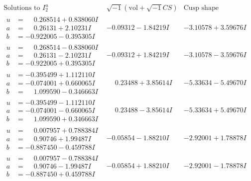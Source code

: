 \documentclass[1p]{elsarticle_modified}
\theoremstyle{definition}
\newcommand{\I}{\sqrt{-1}}
\begin{document}
$$\begin{array}{c|c|c}  
\text{Solutions to }I^u_{2}& \I (\text{vol} + \sqrt{-1}CS) & \text{Cusp shape}\\
 \hline 
\begin{aligned}
u &= \phantom{-}0.268514 + 0.838060 I \\
a &= \phantom{-}0.26131 + 2.10231 I \\
b &= -0.922005 - 0.395305 I\end{aligned}
 & -0.09312 - 1.84219 I & -3.10578 + 3.59676 I \\ \hline\begin{aligned}
u &= \phantom{-}0.268514 - 0.838060 I \\
a &= \phantom{-}0.26131 - 2.10231 I \\
b &= -0.922005 + 0.395305 I\end{aligned}
 & -0.09312 + 1.84219 I & -3.10578 - 3.59676 I \\ \hline\begin{aligned}
u &= -0.395499 + 1.112110 I \\
a &= -0.074001 + 0.660065 I \\
b &= \phantom{-}1.099590 - 0.346663 I\end{aligned}
 & \phantom{-}0.23488 + 3.85614 I & -5.33634 - 5.49670 I \\ \hline\begin{aligned}
u &= -0.395499 - 1.112110 I \\
a &= -0.074001 - 0.660065 I \\
b &= \phantom{-}1.099590 + 0.346663 I\end{aligned}
 & \phantom{-}0.23488 - 3.85614 I & -5.33634 + 5.49670 I \\ \hline\begin{aligned}
u &= \phantom{-}0.007957 + 0.788384 I \\
a &= \phantom{-}0.90746 + 1.99487 I \\
b &= -0.887450 - 0.459788 I\end{aligned}
 & -0.05854 - 1.88210 I & -2.92001 + 1.78878 I \\ \hline\begin{aligned}
u &= \phantom{-}0.007957 - 0.788384 I \\
a &= \phantom{-}0.90746 - 1.99487 I \\
b &= -0.887450 + 0.459788 I\end{aligned}
 & -0.05854 + 1.88210 I & -2.92001 - 1.78878 I \\ \hline\begin{aligned}

\end{aligned}
\end{array}$$
\end{document}
